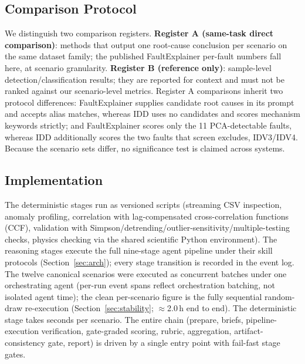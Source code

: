 \documentclass[preprint,10pt]{elsarticle}
\begin{document}
\subsection{Comparison Protocol}
We distinguish two comparison registers. \textbf{Register A (same-task direct comparison)}: methods that output one root-cause conclusion per scenario on the same dataset family; the published FaultExplainer per-fault numbers fall here, at scenario granularity. \textbf{Register B (reference only)}: sample-level detection/classification results; they are reported for context and must not be ranked against our scenario-level metrics. Register A comparisons inherit two protocol differences: FaultExplainer supplies candidate root causes in its prompt and accepts alias matches, whereas IDD uses no candidates and scores mechanism keywords strictly; and FaultExplainer scores only the 11 PCA-detectable faults, whereas IDD additionally scores the two faults that screen excludes, IDV3/IDV4. Because the scenario sets differ, no significance test is claimed across systems.

\subsection{Implementation}
The deterministic stages run as versioned scripts (streaming CSV inspection, anomaly profiling, correlation with lag-compensated cross-correlation functions (CCF), validation with Simpson/detrending/outlier-sensitivity/multiple-testing checks, physics checking via the shared scientific Python environment). The reasoning stages execute the full nine-stage agent pipeline under their skill protocols (Section~\ref{sec:arch}); every stage transition is recorded in the event log. The twelve canonical scenarios were executed as concurrent batches under one orchestrating agent (per-run event spans reflect orchestration batching, not isolated agent time); the clean per-scenario figure is the fully sequential random-draw re-execution (Section~\ref{sec:stability}; $\approx$2.0\,h end to end). The deterministic stage takes seconds per scenario. The entire chain (prepare, briefs, pipeline-execution verification, gate-graded scoring, rubric, aggregation, artifact-consistency gate, report) is driven by a single entry point with fail-fast stage gates.\medskip
\end{document}
